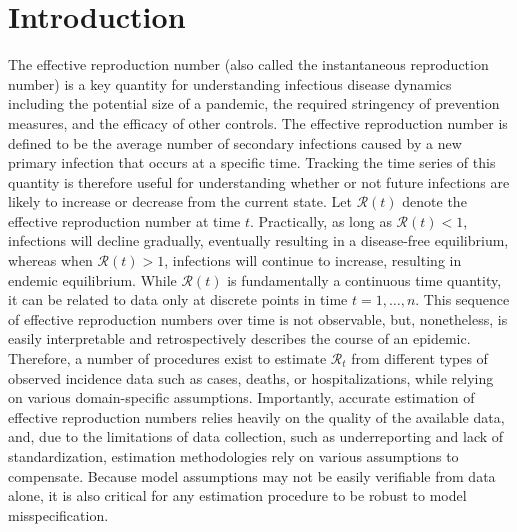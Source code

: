 \documentclass[10pt,letterpaper]{article}
\def\calR{\mathcal{R}}
\begin{document}
\linenumbers

\section{Introduction}
\label{sec:intro}

The effective reproduction number (also called the instantaneous reproduction
number) is a key quantity for understanding infectious disease dynamics
including the potential size of a pandemic, the required stringency of
prevention measures, and the efficacy of other controls. The effective
reproduction number is defined to be the average number of secondary infections
caused by a new primary infection that occurs at a specific time. Tracking the
time series of this quantity is therefore useful for understanding whether or
not future infections are likely to increase or decrease from the current state.
Let $\calR(t)$ denote the effective reproduction number at time $t$.
Practically, as long as $\calR(t) < 1$, infections will decline gradually,
eventually resulting in a disease-free equilibrium, whereas when $\calR(t) > 1$,
infections will continue to increase, resulting in endemic equilibrium. 
While $\calR(t)$ is fundamentally a continuous time quantity, it can be related
to data only at discrete points in time $t = 1,\ldots,n$.
This sequence of effective reproduction numbers over time is not observable, but,
nonetheless, is easily interpretable and retrospectively describes the course of
an epidemic. Therefore, a number of procedures exist to estimate $\calR_t$ from
different types of observed incidence data such as cases, deaths, or
hospitalizations, while relying on various domain-specific assumptions.
Importantly, accurate estimation of effective reproduction numbers relies
heavily on the quality of the available data, and, due to the limitations of
data collection, such as underreporting and lack of standardization,
estimation methodologies rely on various assumptions to
compensate. Because model assumptions may not be easily verifiable from data
alone, it is also critical for any estimation procedure to be robust to model
misspecification. 
\end{document}
